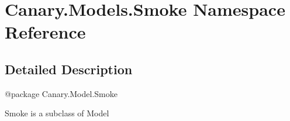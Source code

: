 \hypertarget{namespace_canary_1_1_models_1_1_smoke}{\section{Canary.\-Models.\-Smoke Namespace Reference}
\label{namespace_canary_1_1_models_1_1_smoke}
}


\subsection{Detailed Description}
\begin{DoxyVerb}@package Canary.Model.Smoke

Smoke is a subclass of Model
\end{DoxyVerb}
 